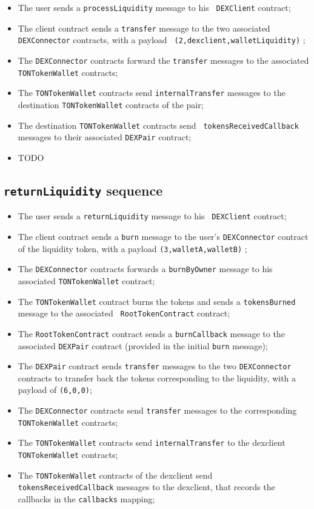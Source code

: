 \begin{itemize}
\item The user sends a {\tt processLiquidity} message to his {\tt
  DEXClient} contract;
\item The client contract sends a {\tt transfer} message to the two
  associated {\tt DEXConnector} contracts, with a payload {\tt
    (2,dexclient,walletLiquidity)} ;
\item The {\tt DEXConnector} contracts forward the {\tt transfer}
  messages to the associated {\tt TONTokenWallet} contracts;
\item The {\tt TONTokenWallet} contracts send {\tt internalTransfer}
  messages to the destination {\tt TONTokenWallet} contracts of the
  pair;
\item The destination {\tt TONTokenWallet} contracts send {\tt
  tokensReceivedCallback} messages to their associated {\tt DEXPair}
  contract;
\item TODO
\end{itemize}

\subsection{{\tt returnLiquidity} sequence}

\begin{itemize}
\item The user sends a {\tt returnLiquidity} message to his {\tt
  DEXClient} contract;
\item The client contract sends a {\tt burn} message to the user's
  {\tt DEXConnector} contract of the liquidity token, with a payload
  {\tt (3,walletA,walletB)} ;
\item The {\tt DEXConnector} contracts forwards a {\tt burnByOwner}
  message to his associated {\tt TONTokenWallet} contract;
\item The {\tt TONTokenWallet} contract burns the tokens and sends a
  {\tt tokensBurned} message to the associated {\tt
    RootTokenContract} contract;
\item The {\tt RootTokenContract} contract sends a {\tt burnCallback}
  message to the associated {\tt DEXPair} contract (provided in the
  initial {\tt burn} message);
\item The {\tt DEXPair} contract sends {\tt transfer} messages to the
  two {\tt DEXConnector} contracts to transfer back the tokens
  corresponding to the liquidity, with a payload of {\tt (6,0,0)};
\item The {\tt DEXConnector} contracts send {\tt transfer} messages to
  the corresponding {\tt TONTokenWallet} contracts;
\item The {\tt TONTokenWallet} contracts send {\tt internalTransfer}
  to the dexclient {\tt TONTokenWallet} contracts;
\item The {\tt TONTokenWallet} contracts of the dexclient send {\tt
  tokensReceivedCallback} messages to the dexclient, that records the
  callbacks in the {\tt callbacks} mapping;
\end{itemize}
